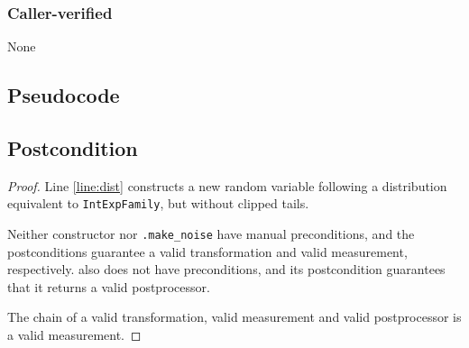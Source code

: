 \documentclass{article}
\begin{document}
\subsubsection*{Caller-verified}
None

\subsection*{Pseudocode}


\subsection*{Postcondition}
\begin{theorem}
\end{theorem}

\begin{proof}
    Line \ref{line:dist} constructs a new random variable following a distribution equivalent to \texttt{IntExpFamily},
    but without clipped tails.

    Neither constructor  nor
    \texttt{.make\_noise} have manual preconditions,
    and the postconditions guarantee a valid transformation and valid measurement, respectively.
     also does not have preconditions,
    and its postcondition guarantees that it returns a valid postprocessor.

    The chain of a valid transformation, valid measurement and valid postprocessor is a valid measurement.
\end{proof}
\end{document}
